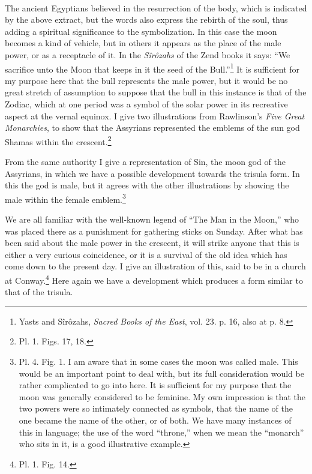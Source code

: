 \documentclass[a4paper, 11pt, oneside, english, landscape, twocolumn]{article}
\begin{document}
\paragraph{}
The ancient Egyptians believed in the resurrection of the body, which is indicated by the above extract, but the words also express the rebirth of the soul, thus adding a spiritual significance to the symbolization. In this case the moon becomes a kind of vehicle, but in others it appears as the place of the male power, or as a receptacle of it. In the \emph{Sîrôzahs} of the Zend books it says: ``We sacrifice unto the Moon that keeps in it the seed of the Bull.''\footnote{Yasts and Sîrôzahs, \emph{Sacred Books of the East}, vol. 23. p. 16, also at p. 8.} It is sufficient for my purpose here that the bull represents the male power, but it would be no great stretch of assumption to suppose that the bull in this instance is that of the Zodiac, which at one period was a symbol of the solar power in its recreative aspect at the vernal equinox. I give two illustrations from Rawlinson's \emph{Five Great Monarchies}, to show that the Assyrians represented the emblems of the sun god Shamas within the crescent.\footnote{Pl. 1. Figs. 17, 18.}

From the same authority I give a representation of Sin, the moon god of the Assyrians, in which we have a possible development towards the trisula form. In this the god is male, but it agrees with the other illustrations by showing the male within the female emblem.\footnote{Pl. 4. Fig. 1. I am aware that in some cases the moon was called male. This would be an important point to deal with, but its full consideration would be rather complicated to go into here. It is sufficient for my purpose that the moon was generally considered to be feminine. My own impression is that the two powers were so intimately connected as symbols, that the name of the one became the name of the other, or of both. We have many instances of this in language; the use of the word ``throne,'' when we mean the ``monarch'' who sits in it, is a good illustrative example.}

We are all familiar with the well-known legend of ``The Man in the Moon,'' who was placed there as a punishment for gathering sticks on Sunday. After what has been said about the male power in the crescent, it will strike anyone that this is either a very curious coincidence, or it is a survival of the old idea which has come down to the present day. I give an illustration of this, said to be in a church at Conway.\footnote{Pl. 1. Fig. 14.} Here again we have a development which produces a form similar to that of the trisula.
\end{document}

